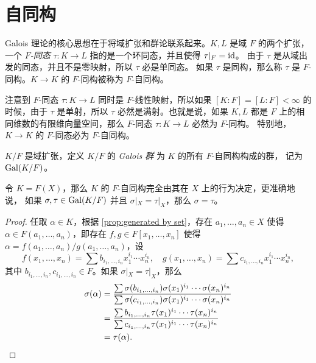 \section{自同构}

Galois 理论的核心思想在于将域扩张和群论联系起来。$K,L$ 是域 $F$ 的两个扩张，
一个 \emph{$F$-同态} $\tau:K\to L$ 指的是一个环同态，并且使得 $\tau|_F=\operatorname{id}$。
由于 $\tau$ 是从域出发的同态，并且不是零映射，所以 $\tau$ 必是单同态。
如果 $\tau$ 是同构，那么称 $\tau$ 是 $F$-同构。$K\to K$ 的 $F$-同构被称为
$F$-自同构。

注意到 $F$-同态 $\tau:K\to L$ 同时是 $F$-线性映射，所以如果 $[K:F]=[L:F]<\infty$
的时候，由于 $\tau$ 是单射，所以 $\tau$ 必然是满射。也就是说，如果 $K,L$
都是 $F$ 上的相同维数的有限维向量空间，那么 $F$-同态 $\tau:K\to L$ 必然为 $F$-同构。
特别地，$K\to K$ 的 $F$-同态必为 $F$-自同构。 

\begin{definition}
  $K/F$ 是域扩张，定义 $K/F$ 的 \emph{Galois 群} 为 $K$ 的所有 $F$-自同构构成的群，
  记为 $\operatorname{Gal}(K/F)$。
\end{definition}

\begin{lemma}\label{lemma:tau determined by X}
  令 $K=F(X)$，那么 $K$ 的 $F$-自同构完全由其在 $X$ 上的行为决定，更准确地说，
  如果 $\sigma,\tau\in\operatorname{Gal}(K/F)$ 并且 $\sigma|_X=\tau|_X$，那么 $\sigma=\tau$。
\end{lemma} 
\begin{proof}
  任取 $\alpha\in K$，根据 \autoref{prop:generated by set}，存在 $a_1,\dots,a_n\in X$
  使得 $\alpha\in F(a_1,\dots,a_n)$，即存在 $f,g\in F[x_1,\dots,x_n]$ 使得
  $\alpha=f(a_1,\dots,a_n)/g(a_1,\dots,a_n)$，设
  \[
    f(x_1,\dots,x_n)  =\sum b_{i_1,\dots,i_n} x_1^{i_1}\cdots x_n^{i_n},\quad
    g(x_1,\dots,x_n)  =\sum c_{i_1,\dots,i_n} x_1^{i_1}\cdots x_n^{i_n},
  \]
  其中 $b_{i_1,\dots,i_n},c_{i_1,\dots,i_n}\in F$。如果 $\sigma|_X=\tau|_X$，那么
  \begin{align*}
    \sigma(\alpha)&=
    \frac{\sum \sigma(b_{i_1,\dots,i_n}) \sigma(x_1)^{i_1}\cdots \sigma(x_n)^{i_n}}
    {\sum \sigma(c_{i_1,\dots,i_n})\sigma(x_1)^{i_1}\cdots \sigma(x_n)^{i_n}}\\
    &=
    \frac{\sum b_{i_1,\dots,i_n} \tau(x_1)^{i_1}\cdots \tau(x_n)^{i_n}}
    {\sum c_{i_1,\dots,i_n}\tau(x_1)^{i_1}\cdots \tau(x_n)^{i_n}}\\
    &=\tau(\alpha).\qedhere
  \end{align*}
\end{proof}

